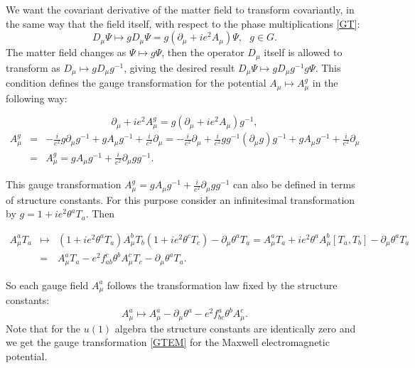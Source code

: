 \documentclass[11pt]{report}
\theoremstyle{plain}
\theoremstyle{definition}
\theoremstyle{remark}
\theoremstyle{remark}
\numberwithin{equation}{section}
\begin{document}
We want the covariant derivative of the matter field to transform covariantly, in the same way that the field itself, with respect to the phase multiplications \eqref{GT}:
%
\begin{equation}
 D_{\mu} \Psi \mapsto  g D_{\mu}\Psi = g (\partial_{\mu} + i e^2 A_{\mu})\Psi, \,\,\, \, g\in G.
 \end{equation}
 The matter field changes as $\Psi \mapsto g\Psi$, then the operator $D_{\mu}$ itself is allowed to transform as $D_{\mu} \mapsto gD_{\mu}g^{-1}$, giving the desired result $D_{\mu}\Psi \mapsto gD_{\mu}g^{-1}g\Psi$. 
 This condition defines the gauge transformation for the potential $A_{\mu} \mapsto A_{\mu}^g$ in the following way:
 \begin{spacing}{1.45}
 $$\partial_{\mu} + i e^2 A_{\mu}^g = g(\partial_{\mu} + i e^2 A_{\mu})g^{-1},$$
\begin{equation}\label{YMGT}
 \begin{array}{lll} 
 A_{\mu}^g & = & -\frac{i}{e^2}g\partial_{\mu}g^{-1} + g A_{\mu}g^{-1} +\frac{i}{e^2} \partial_{\mu} = -\frac{i}{e^2}\partial_{\mu} + \frac{i}{e^2}gg^{-1}(\partial_{\mu}g)g^{-1} + g A_{\mu}g^{-1} +\frac{i}{e^2}\partial_{\mu}\\
 &=& A_{\mu}^g = g A_{\mu}g^{-1} + \frac{i}{e^2}\partial_{\mu}gg^{-1}.
 \end{array}
 \end{equation}
\end{spacing} 

 
 This gauge transformation $A_{\mu}^g = g A_{\mu}g^{-1} + \frac{i}{e^2}\partial_{\mu}gg^{-1}$ can also be defined in terms of structure constants. 
 For this purpose consider an infinitesimal transformation by $g = 1+ie^2\theta^a T_a$. Then 
 \begin{spacing}{1.45}
$\begin{array}{lll}
 A_{\mu}^a T_a & \mapsto  & (1+ie^2\theta^a T_a) A_{\mu}^b T_b (1+ie^2\theta^c T_c) - \partial_{\mu} \theta^aT_a =  A_{\mu}^a T_a + ie^2\theta^aA_{\mu}^b[ T_a, T_b] -\partial_{\mu} \theta^aT_a\\
& =&  A_{\mu}^a T_a -e^2 f_{ab}^c\theta^bA_{\mu}^cT_c - \partial_{\mu} \theta^a T_a.
\end{array}$
\end{spacing} 
So each gauge field $A^a_{\mu}$ follows the transformation law fixed by the structure constants:
%
\begin{equation}
 A_{\mu}^a  \mapsto A_{\mu}^a   - \partial_{\mu} \theta^a - e^2 f^a_{bc}\theta^bA_{\mu}^c.
 \end{equation}
 Note that for the $u(1)$ algebra the structure constants are identically zero and we get the gauge transformation \eqref{GTEM} for the Maxwell electromagnetic potential.
 
\end{document}
